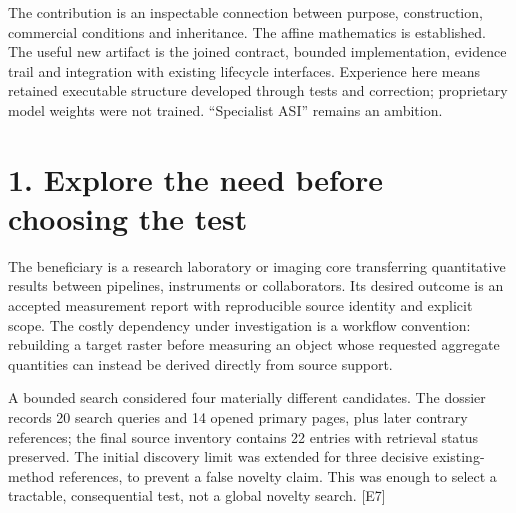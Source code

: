 \documentclass[10pt,a4paper]{article}
\begin{document}
The contribution is an inspectable connection between purpose,
construction, commercial conditions and inheritance. The affine
mathematics is established. The useful new artifact is the joined
contract, bounded implementation, evidence trail and integration with
existing lifecycle interfaces. Experience here means retained executable
structure developed through tests and correction; proprietary model
weights were not trained. ``Specialist ASI'' remains an ambition.

\clearpage

\hypertarget{explore-the-need-before-choosing-the-test}{%
\section{1. Explore the need before choosing the
test}\label{explore-the-need-before-choosing-the-test}}

The beneficiary is a research laboratory or imaging core transferring
quantitative results between pipelines, instruments or collaborators.
Its desired outcome is an accepted measurement report with reproducible
source identity and explicit scope. The costly dependency under
investigation is a workflow convention: rebuilding a target raster
before measuring an object whose requested aggregate quantities can
instead be derived directly from source support.

A bounded search considered four materially different candidates. The
dossier records 20 search queries and 14 opened primary pages, plus
later contrary references; the final source inventory contains 22
entries with retrieval status preserved. The initial discovery limit was
extended for three decisive existing-method references, to prevent a
false novelty claim. This was enough to select a tractable,
consequential test, not a global novelty search. {[}E7{]}
\end{document}
